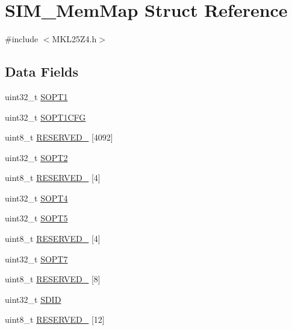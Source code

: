 \hypertarget{struct_s_i_m___mem_map}{}\section{S\+I\+M\+\_\+\+Mem\+Map Struct Reference}
\label{struct_s_i_m___mem_map}


{\ttfamily \#include $<$M\+K\+L25\+Z4.\+h$>$}

\subsection*{Data Fields}
\begin{DoxyCompactItemize}
\item 
uint32\+\_\+t \hyperlink{struct_s_i_m___mem_map_a1152a6ef88c78e762df97badf10b5050}{S\+O\+P\+T1}
\item 
uint32\+\_\+t \hyperlink{struct_s_i_m___mem_map_a9b6ea6819e80eeaa90754b6e91fcc808}{S\+O\+P\+T1\+C\+FG}
\item 
uint8\+\_\+t \hyperlink{struct_s_i_m___mem_map_afaf8190e210f8ed4ae7309c0ef700304}{R\+E\+S\+E\+R\+V\+E\+D\+\_} \mbox{[}4092\mbox{]}
\item 
uint32\+\_\+t \hyperlink{struct_s_i_m___mem_map_ae4c4bf827aeca9c2de082cdfafdea3d1}{S\+O\+P\+T2}
\item 
uint8\+\_\+t \hyperlink{struct_s_i_m___mem_map_ae97b8ef108928032cc6070216fec02ec}{R\+E\+S\+E\+R\+V\+E\+D\+\_} \mbox{[}4\mbox{]}
\item 
uint32\+\_\+t \hyperlink{struct_s_i_m___mem_map_adf28cda65cea7072379ec6064d0d93cc}{S\+O\+P\+T4}
\item 
uint32\+\_\+t \hyperlink{struct_s_i_m___mem_map_a19e2ddf391b1d9c03240be8267fdf781}{S\+O\+P\+T5}
\item 
uint8\+\_\+t \hyperlink{struct_s_i_m___mem_map_a291f9d8d1d4e3f8a94668f14592402b0}{R\+E\+S\+E\+R\+V\+E\+D\+\_} \mbox{[}4\mbox{]}
\item 
uint32\+\_\+t \hyperlink{struct_s_i_m___mem_map_a04a22056fd7d08179705d29cda1b9e2a}{S\+O\+P\+T7}
\item 
uint8\+\_\+t \hyperlink{struct_s_i_m___mem_map_a581c4826706d6c336d1847b83d3dd89a}{R\+E\+S\+E\+R\+V\+E\+D\+\_} \mbox{[}8\mbox{]}
\item 
uint32\+\_\+t \hyperlink{struct_s_i_m___mem_map_a536b8d3e185149c51e88387350e20fb3}{S\+D\+ID}
\item 
uint8\+\_\+t \hyperlink{struct_s_i_m___mem_map_a5a6fab98427eb3ae20ebd13a740d55ad}{R\+E\+S\+E\+R\+V\+E\+D\+\_} \mbox{[}12\mbox{]}

\end{DoxyCompactItemize}
